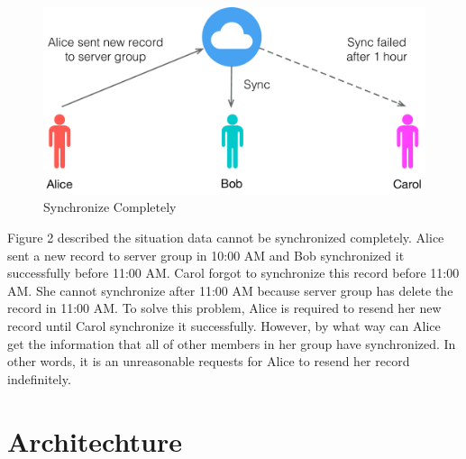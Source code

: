 \documentclass[twocolumn,10pt]{article}
\begin{document}
\begin{figure}[t]
\centering
\includegraphics[scale=0.4]{sync_completely}
\caption{Synchronize Completely}
\end{figure}

Figure 2 described the situation data cannot be synchronized completely. Alice sent a new record to server group in 10:00 AM and Bob synchronized it successfully before 11:00 AM. Carol forgot to synchronize this record before 11:00 AM. She cannot synchronize after 11:00 AM because server group has delete the record in 11:00 AM. To solve this problem, Alice is required to resend her new record until Carol synchronize it successfully. However, by what way can Alice get the information that all of other members in her group have synchronized. In other words, it is an unreasonable requests for Alice to resend her record indefinitely.

\section{Architechture}

{\tiny
\printbibliography
}
\end{document}

